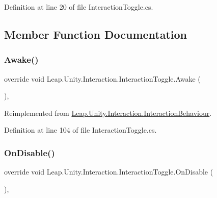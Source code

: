 Definition at line 20 of file Interaction\+Toggle.\+cs.



\subsection{Member Function Documentation}
\mbox{\label{class_leap_1_1_unity_1_1_interaction_1_1_interaction_toggle_ad2840a310771196cfe8e13b6e21e0fdd}} 
\subsubsection{\texorpdfstring{Awake()}{Awake()}}
{\footnotesize\ttfamily override void Leap.\+Unity.\+Interaction.\+Interaction\+Toggle.\+Awake (\begin{DoxyParamCaption}{ }\end{DoxyParamCaption})\hspace{0.3cm}{\ttfamily [protected]}, {\ttfamily [virtual]}}



Reimplemented from \mbox{\hyperlink{class_leap_1_1_unity_1_1_interaction_1_1_interaction_behaviour_a977d761c28ec527aedebd97ce9f8b981}{Leap.\+Unity.\+Interaction.\+Interaction\+Behaviour}}.



Definition at line 104 of file Interaction\+Toggle.\+cs.

\mbox{\label{class_leap_1_1_unity_1_1_interaction_1_1_interaction_toggle_a9cbebe0123cbea22e469877317fa97ac}} 
\subsubsection{\texorpdfstring{OnDisable()}{OnDisable()}}
{\footnotesize\ttfamily override void Leap.\+Unity.\+Interaction.\+Interaction\+Toggle.\+On\+Disable (\begin{DoxyParamCaption}{ }\end{DoxyParamCaption})\hspace{0.3cm}{\ttfamily [protected]}, {\ttfamily [virtual]}}



